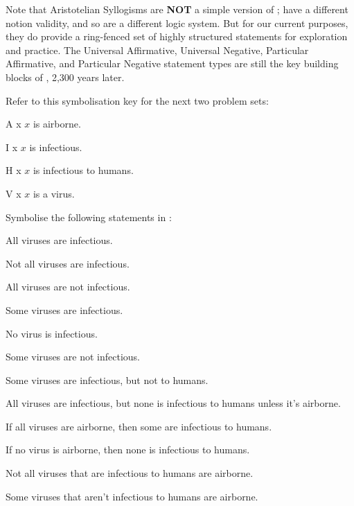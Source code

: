 \documentclass[PHIL101-Textbook.tex]{subfiles}
\begin{document}
Note that Aristotelian Syllogisms are \textbf{NOT} a simple version of \pl; have a different notion validity, and so are a different logic system. But for our current purposes, they do provide a ring-fenced set of highly structured statements for exploration and practice. The Universal Affirmative, Universal Negative, Particular Affirmative, and Particular Negative statement types are still the key building blocks of \pl, 2,300 years later.









\pagebreak
\practiceproblems
Refer to this symbolisation key for the next two problem sets: 

\begin{ekey}
\item[\atom A x] $x$ is airborne. 
\item[\atom I x] $x$ is infectious.
\item[\atom H x] $x$ is infectious to humans.
\item[\atom V x] $x$ is a virus.
\end{ekey}


\noindent\problempart
\label{pr.pl.symbol4}
Symbolise the following statements in \pl:
\begin{earg}
\item All viruses are infectious.
\item Not all viruses are infectious.
\item All viruses are not infectious. 
\item Some viruses are infectious.
\item No virus is infectious.
\item Some viruses are not infectious. 
\item Some viruses are infectious, but not to humans.
\item All viruses are infectious, but none is infectious to humans unless it's airborne.
\item If all viruses are airborne, then some are infectious to humans.
\item If no virus is airborne, then none is infectious to humans.
\item Not all viruses that are infectious to humans are airborne.
\item Some viruses that aren't infectious to humans are airborne.
\end{earg}
\end{document}
